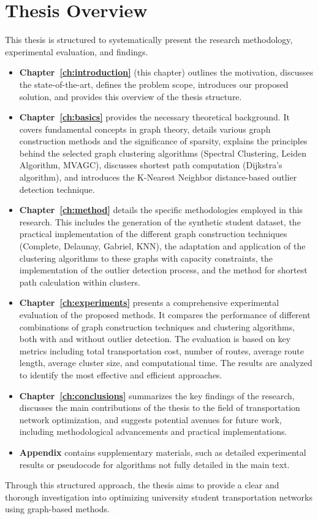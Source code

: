 \section{Thesis Overview}
\label{sec:intro_overview}
This thesis is structured to systematically present the research methodology, experimental evaluation, and findings.
\begin{itemize}
    \item \textbf{Chapter~\ref{ch:introduction}} (this chapter) outlines the motivation, discusses the state-of-the-art, defines the problem scope, introduces our proposed solution, and provides this overview of the thesis structure.
    \item \textbf{Chapter~\ref{ch:basics}} provides the necessary theoretical background. It covers fundamental concepts in graph theory, details various graph construction methods and the significance of sparsity, explains the principles behind the selected graph clustering algorithms (Spectral Clustering, Leiden Algorithm, MVAGC), discusses shortest path computation (Dijkstra's algorithm), and introduces the K-Nearest Neighbor distance-based outlier detection technique.
    \item \textbf{Chapter~\ref{ch:method}} details the specific methodologies employed in this research. This includes the generation of the synthetic student dataset, the practical implementation of the different graph construction techniques (Complete, Delaunay, Gabriel, KNN), the adaptation and application of the clustering algorithms to these graphs with capacity constraints, the implementation of the outlier detection process, and the method for shortest path calculation within clusters.
    \item \textbf{Chapter~\ref{ch:experiments}} presents a comprehensive experimental evaluation of the proposed methods. It compares the performance of different combinations of graph construction techniques and clustering algorithms, both with and without outlier detection. The evaluation is based on key metrics including total transportation cost, number of routes, average route length, average cluster size, and computational time. The results are analyzed to identify the most effective and efficient approaches.
    \item \textbf{Chapter~\ref{ch:conclusions}} summarizes the key findings of the research, discusses the main contributions of the thesis to the field of transportation network optimization, and suggests potential avenues for future work, including methodological advancements and practical implementations.
    \item \textbf{Appendix} contains supplementary materials, such as detailed experimental results or pseudocode for algorithms not fully detailed in the main text.
\end{itemize}
Through this structured approach, the thesis aims to provide a clear and thorough investigation into optimizing university student transportation networks using graph-based methods.






